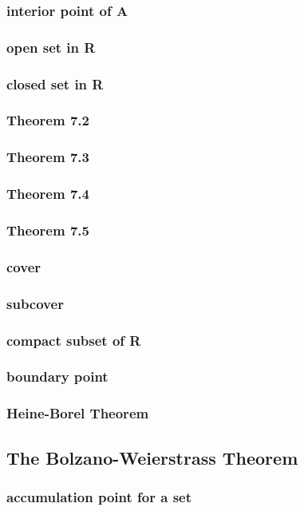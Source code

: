 \documentclass[a4paper]{article}
\begin{document}
\subsubsection*{interior point of A}
\subsubsection*{open set in R}
\subsubsection*{closed set in R}
\subsubsection*{Theorem 7.2}
\subsubsection*{Theorem 7.3}
\subsubsection*{Theorem 7.4}
\subsubsection*{Theorem 7.5}
\subsubsection*{cover}
\subsubsection*{subcover}
\subsubsection*{compact subset of R}
\subsubsection*{boundary point}
\subsubsection*{Heine-Borel Theorem}

\newpage
\subsection{The Bolzano-Weierstrass Theorem}   %
\subsubsection*{accumulation point for a set}
\end{document}
